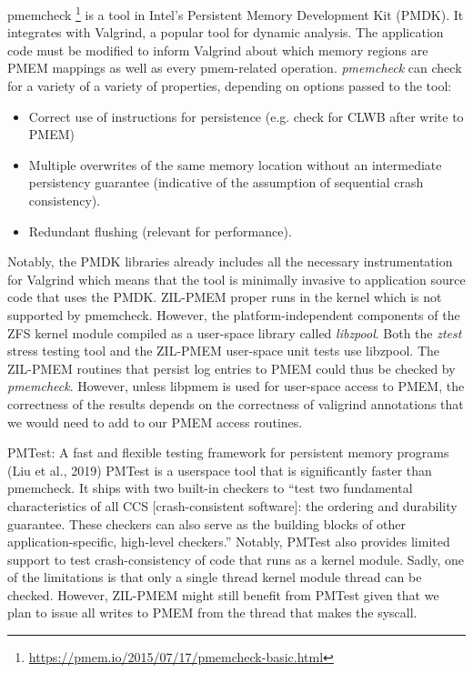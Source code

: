 \documentclass[12pt,a4paper,twoside,draft]{book}
\begin{document}
pmemcheck \footnote{\url{https://pmem.io/2015/07/17/pmemcheck-basic.html}} is a tool in Intel’s Persistent Memory Development Kit (PMDK).
It integrates with Valgrind, a popular tool for dynamic analysis.
The application code must be modified to inform Valgrind about which memory regions are PMEM mappings as well as every pmem-related operation.
\textit{pmemcheck} can check for a variety of a variety of properties, depending on options passed to the tool:
\begin{itemize}[noitemsep]
    \item Correct use of instructions for persistence (e.g. check for CLWB after write to PMEM)
    \item Multiple overwrites of the same memory location without an intermediate persistency guarantee (indicative of the assumption of sequential crash consistency).
    \item Redundant flushing (relevant for performance).
\end{itemize}
Notably, the PMDK libraries already includes all the necessary instrumentation for Valgrind which means that the tool is minimally invasive to application source code that uses the PMDK.
ZIL-PMEM proper runs in the kernel which is not supported by pmemcheck.
However, the platform-independent components of the ZFS kernel module compiled as a user-space library called \textit{libzpool}.
Both the \textit{ztest} stress testing tool and the ZIL-PMEM user-space unit tests use libzpool.
The ZIL-PMEM routines that persist log entries to PMEM could thus be checked by \textit{pmemcheck}.
However, unless libpmem is used for user-space access to PMEM, the correctness of the results depends on the correctness of valigrind annotations that we would need to add to our PMEM access routines.

PMTest: A fast and flexible testing framework for persistent memory programs (Liu et al., 2019)
PMTest is a userspace tool that is significantly faster than pmemcheck.
It ships with two built-in checkers to
  “test two fundamental characteristics of all CCS [crash-consistent software]: the ordering and durability guarantee.
  These checkers can also serve as the building blocks of other application-specific, high-level checkers.”
Notably, PMTest also provides limited support to test crash-consistency of code that runs as a kernel module.
Sadly, one of the limitations is that only a single thread kernel module thread can be checked.
However, ZIL-PMEM might still benefit from PMTest given that we plan to issue all writes to PMEM from the thread that makes the syscall.
\end{document}
